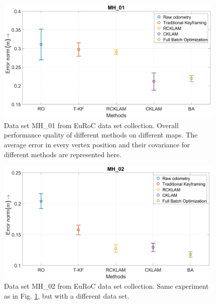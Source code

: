 \begin{figure}
	\centering
		\includegraphics[width=1.00\textwidth]{images/MethodComparisonMH01.png}
  \caption{Data set MH\_01 from EuRoC \cite{Burri25012016} data set collection. Overall performance quality of different methods on different maps. The average error in every vertex position and their covariance for different methods are represented here.}
  \label{fig:MethodComparisonMH01}
\end{figure}

\begin{figure}
	\centering
		\includegraphics[width=1.00\textwidth]{images/MethodComparisonMH02.png}
  \caption{Data set MH\_02 from EuRoC \cite{Burri25012016} data set collection. Same experiment as in Fig. \ref{fig:MethodComparisonMH01}, but with a different data set.}
  \label{fig:MethodComparisonMH02}
\end{figure}

